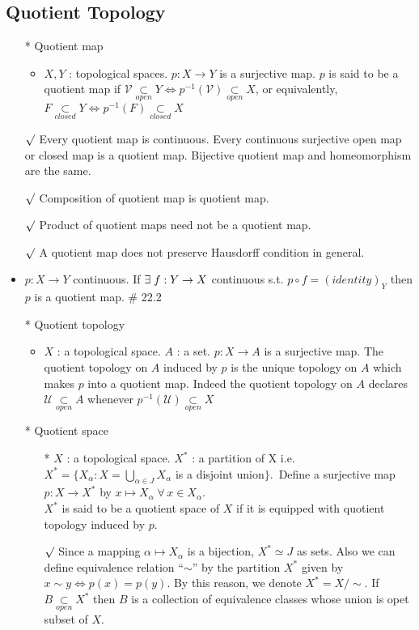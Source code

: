 \documentclass[12pt]{article}
\newcommand{\rmk}{$\surd$}
\newcommand{\spone}{\hspace{0.1cm}}
\newcommand{\open}{\underset{open}{\subset}}
\newcommand{\closed}{\underset{closed}{\subset}}
\newcommand{\exist}{\exists\spone}
\begin{document}
\subsection{Quotient Topology}
\smallskip
\begin{itemize}
	\item[*] Quotient map
	\begin{itemize}
		\item $X, Y$ : topological spaces. $p : X\rightarrow Y$ is a surjective map. $p$ is said to be a quotient map if $\mathcal{V}\open Y \Leftrightarrow p^{-1}(\mathcal{V})\open X$, or equivalently, $F\closed Y \Leftrightarrow p^{-1}(F)\closed X$
	\end{itemize}
	\item[\rmk] Every quotient map is continuous. Every continuous surjective open map or closed map is a quotient map. Bijective quotient map and homeomorphism are the same.
	\item[\rmk] Composition of quotient map is quotient map.
	\item[\rmk] Product of quotient maps need not be a quotient map.
	\item[\rmk] A quotient map does not preserve Hausdorff condition in general.
	\item $p:X\rightarrow Y$ continuous. If $\exist f : Y\rightarrow X$ continuous s.t. $p\circ f=(identity)_Y$ then $p$ is a quotient map.     \# 22.2
	\item[*] Quotient topology
	\begin{itemize}
		\item $X$ : a topological space. $A$ : a set. $p : X\rightarrow A$ is a surjective map. The quotient topology on $A$ induced by $p$ is the unique topology on $A$ which makes $p$ into a quotient map. Indeed the quotient topology on $A$ declares $\mathcal{U}\open A$ whenever $p^{-1}(\mathcal{U})\open X$
	\end{itemize}
	\item[*] Quotient space
	\begin{itemize}
		\item[*] $X$ : a topological space. $X^*$ : a partition of X \; i.e.\, $X^*=\{X_\alpha : X=\bigcup_{\alpha\in J}X_\alpha$ is a disjoint union$\}$.\, Define a surjective map $p : X\rightarrow X^*$ by $x\mapsto X_\alpha \; \forall \, x\in X_\alpha$.\\ $X^*$ is said to be a quotient space of $X$ if it is equipped with quotient topology induced by $p$.
		\item[\rmk] Since a mapping $\alpha \mapsto X_\alpha$ is a bijection, $X^*\simeq J$ as sets. Also we can define equivalence relation ``$\sim$'' by the partition $X^*$ given by $x\sim y \Leftrightarrow p(x)=p(y)$. By this reason, we denote $X^*=X/\sim$. If $B\open X^*$ then $B$ is a collection of equivalence classes whose union is opet subset of $X$.

\end{itemize}
\end{itemize}
\end{document}
